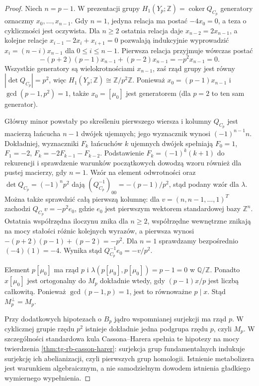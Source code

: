 \begin{proof}
Niech $n=p-1$. W prezentacji grupy
$H_1(Y_p;\mathbb Z)=\operatorname{coker}Q_{C_p}$
generatory oznaczmy $x_0,\ldots,x_{n-1}$.
Gdy $n=1$, jedyna relacja ma postać
$-4x_0=0$, a teza o cykliczności jest oczywista.
Dla $n\ge2$ ostatnia relacja daje
$x_{n-2}=2x_{n-1}$, a kolejne relacje
$ x_{i-1}-2x_i+x_{i+1}=0$
pozwalają indukcyjnie wyprowadzić
$x_i=(n-i)x_{n-1}$ dla $0\le i\le n-1$.
Pierwsza relacja przyjmuje wówczas postać
\[
-(p+2)(p-1)x_{n-1}+(p-2)x_{n-1}
=-p^2x_{n-1}=0.
\]
Wszystkie generatory są wielokrotnościami
$x_{n-1}$, zaś rząd grupy jest równy
$|\det Q_{C_p}|=p^2$, więc
$H_1(Y_p;\mathbb Z)\cong\mathbb Z/p^2\mathbb Z$.
Ponieważ $x_0=(p-1)x_{n-1}$ i
$\gcd(p-1,p^2)=1$, także $x_0=[\mu_0]$
jest generatorem (dla $p=2$ to ten sam generator).

Główny minor powstały po skreśleniu pierwszego
wiersza i kolumny $Q_{C_p}$ jest macierzą
łańcucha $n-1$ dwójek ujemnych;
jego wyznacznik wynosi
$(-1)^{n-1}n$. Dokładniej, wyznaczniki $F_k$
łańcuchów $k$ ujemnych dwójek spełniają
$F_0=1$, $F_1=-2$, $F_k=-2F_{k-1}-F_{k-2}$.
Podstawienie $F_k=(-1)^k(k+1)$ do rekurencji
i sprawdzenie warunków początkowych dowodzą
wzoru również dla pustej macierzy, gdy $n=1$.
Wzór na element odwrotności
oraz $\det Q_{C_p}=(-1)^np^2$
dają $(Q_{C_p}^{-1})_{00}=-(p-1)/p^2$,
stąd podany wzór dla $\lambda$.
Można także sprawdzić całą pierwszą kolumnę:
dla $v=(n,n-1,\ldots,1)^T$ zachodzi
$Q_{C_p}v=-p^2 e_0$, gdzie $e_0$ jest pierwszym
wektorem standardowej bazy $\mathbb Z^n$.
Ostatnia współrzędna iloczynu znika dla $n\ge2$,
współrzędne wewnętrzne znikają na mocy
stałości różnic kolejnych wyrazów, a pierwsza
wynosi $-(p+2)(p-1)+(p-2)=-p^2$.
Dla $n=1$ sprawdzamy bezpośrednio $(-4)(1)=-4$.
Wynika stąd $Q_{C_p}^{-1}e_0=-v/p^2$.

Element $p[\mu_0]$ ma rząd $p$ i
$\lambda(p[\mu_0],p[\mu_0])=p-1=0$
w $\mathbb Q/\mathbb Z$.
Ponadto $x[\mu_0]$ jest ortogonalny
do $M_p$ dokładnie wtedy, gdy
$(p-1)x/p$ jest liczbą całkowitą.
Ponieważ $\gcd(p-1,p)=1$,
jest to równoważne $p\mid x$.
Stąd $M_p^\perp=M_p$.

Przy dodatkowych hipotezach o $B_p$
jądro wspomnianej surjekcji ma rząd $p$.
W cyklicznej grupie rzędu $p^2$
istnieje dokładnie jedna podgrupa rzędu $p$,
czyli $M_p$.
W szczególności standardowa kula Cassona--Harera
spełnia te hipotezy na mocy twierdzenia
\ref{thm:tg-rb-casson-harer}: surjekcja grup
fundamentalnych indukuje surjekcję ich abelianizacji,
czyli pierwszych grup homologii. Istnienie metabolizera
jest warunkiem algebraicznym, a nie samodzielnym
dowodem istnienia gładkiego wymiernego wypełnienia.
\end{proof}

